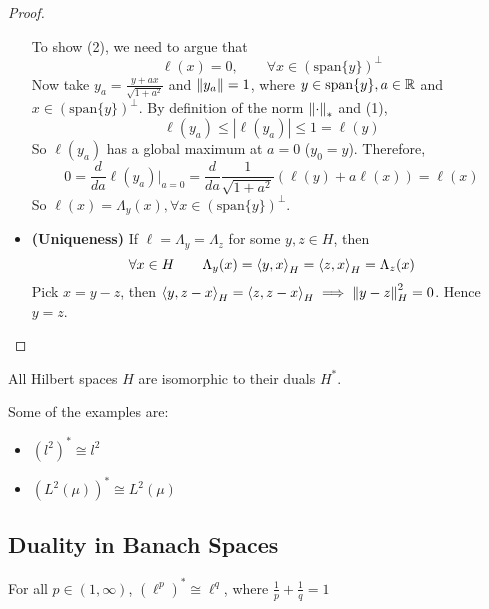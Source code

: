 \documentclass{article}
\begin{document}
\begin{proof}
\begin{itemize}
		      To show (2), we need to argue that
		      \begin{equation*}
			      \ell(x)=0, \qquad \forall x \in (\textrm{span}\{y\})^{\perp}
		      \end{equation*}
		      Now take  \(y_a = \frac{y+ax}{\sqrt{1+a^2}}\) and  \(\left\|{y_a}\right\|=1\), where  \(y \in \textrm{span}\{y\}, a\in \mathbb{R}\) and  \(x \in (\textrm{span}\{y\})^{\perp}\). By definition of the norm  \(\left\|{\cdot}\right\|_*\) and (1),
		      \begin{equation*}
			      \ell(y_a)  \leq |\ell(y_a)| \leq 1 = \ell(y)
		      \end{equation*}
		      So  \(\ell(y_a)\) has a global maximum at  \(a=0\)  (\(y_0=y\)). Therefore,
		      \begin{equation*}
			      0 = \frac{d}{da} \ell(y_a) \Bigr|_{a=0} = \frac{d}{da} \frac{1}{\sqrt{1+a^2}} (\ell(y)+a\ell(x))=\ell(x)
		      \end{equation*}
		      So  \(\ell(x)=\Lambda_y(x), \forall x \in (\textrm{span}\{y\})^{\perp}\).

		\item \textbf{(Uniqueness)}
		      If  \(\ell=\Lambda_y=\Lambda_z\) for some  \(y,z \in H\), then
		      \[
			      \forall x \in H \qquad \Lambda_y(x) = \left<{y},{x}\right>_H = \left<{z},{x}\right>_H = \Lambda_z(x)
		      \]
		      Pick  \(x=y-z\), then  \(\left<{y},{z-x}\right>_H = \left<{z},{z-x}\right>_H \implies \left\|{y-z}\right\|_H^2=0\). Hence  \(y=z\).
	\end{itemize}
\end{proof}

\begin{corollary}
	All Hilbert spaces  \(H\) are isomorphic to their duals  \(H^*\).
\end{corollary}


\begin{example}
	Some of the examples are:
	\begin{itemize}
		\item  \((l^2)^* \cong l^2\)
		\item  \((L^2(\mu))^* \cong L^2(\mu)\)
	\end{itemize}
\end{example}


\subsection{Duality in Banach Spaces}

\begin{theorem}\nl
	For all  \(p \in (1, \infty)\),  \((\ell^p)^* \cong \ell^q\), where  \(\frac{1}{p}+\frac{1}{q}=1\)
\end{theorem}
\end{document}
